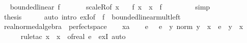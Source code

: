 \begin{isabellebody}
\ \isamarkupfalse%
\ bounded{\isacharunderscore}{\kern0pt}linear\ f\ \isacommand{{\isachardot}{\kern0pt}}\isamarkupfalse%
\isanewline
\ \ \ \ \isamarkupfalse%
\ scaleR{\isacharbrackleft}{\kern0pt}of\ x\ {}{\isacharbrackright}{\kern0pt}\ \isamarkupfalse%
\ {\isachardoublequoteopen}f\ x\ {\isacharequal}{\kern0pt}\ x\ {\isacharasterisk}{\kern0pt}\ f\ {}{\isachardoublequoteclose}\isanewline
\ \ \ \ \ \ \isamarkupfalse%
\ simp\isanewline
\ \ \isacommand{{\isacharbraceright}{\kern0pt}}\isamarkupfalse%
\isanewline
\ \ \isamarkupfalse%
\ \isamarkupfalse%
\ {\isacharquery}{\kern0pt}thesis\isanewline
\ \ \ \ \isamarkupfalse%
\ {\isacharparenleft}{\kern0pt}auto\ intro{\isacharcolon}{\kern0pt}\ exI{\isacharbrackleft}{\kern0pt}of\ {\isacharunderscore}{\kern0pt}\ {\isachardoublequoteopen}f\ {}{\isachardoublequoteclose}{\isacharbrackright}{\kern0pt}\ bounded{\isacharunderscore}{\kern0pt}linear{\isacharunderscore}{\kern0pt}mult{\isacharunderscore}{\kern0pt}left{\isacharparenright}{\kern0pt}\isanewline
{}\isamarkupfalse%
%
\endisatagproof
{\isafoldproof}%
%
\isadelimproof
\isanewline
%
\endisadelimproof
\isanewline
{}\isamarkupfalse%
\ real{\isacharunderscore}{\kern0pt}normed{\isacharunderscore}{\kern0pt}algebra{\isacharunderscore}{\kern0pt}{}\ {\isasymsubseteq}\ perfect{\isacharunderscore}{\kern0pt}space\isanewline
%
\isadelimproof
%
\endisadelimproof
%
\isatagproof
{}\isamarkupfalse%
\isanewline
\ \ \isamarkupfalse%
\ x{\isacharcolon}{\kern0pt}{\isacharcolon}{\kern0pt}{\isacharprime}{\kern0pt}a\isanewline
\ \ \isamarkupfalse%
\ {\isachardoublequoteopen}{\isasymAnd}e{\isachardot}{\kern0pt}\ {}\ {\isacharless}{\kern0pt}\ e\ {\isasymLongrightarrow}\ {\isasymexists}y{\isachardot}{\kern0pt}\ norm\ {\isacharparenleft}{\kern0pt}y\ {\isacharminus}{\kern0pt}\ x{\isacharparenright}{\kern0pt}\ {\isacharless}{\kern0pt}\ e\ {\isasymand}\ y\ {\isasymnoteq}\ x{\isachardoublequoteclose}\isanewline
\ \ \ \ \isamarkupfalse%
\ {\isacharparenleft}{\kern0pt}rule{\isacharunderscore}{\kern0pt}tac\ x\ {\isacharequal}{\kern0pt}\ {\isachardoublequoteopen}x\ {\isacharplus}{\kern0pt}\ of{\isacharunderscore}{\kern0pt}real\ {\isacharparenleft}{\kern0pt}e{\isacharslash}{\kern0pt}{}{\isacharparenright}{\kern0pt}{\isachardoublequoteclose}\ \ exI{\isacharparenright}{\kern0pt}\ auto\isanewline
\ \ \isamarkupfalse%

\end{isabellebody}
